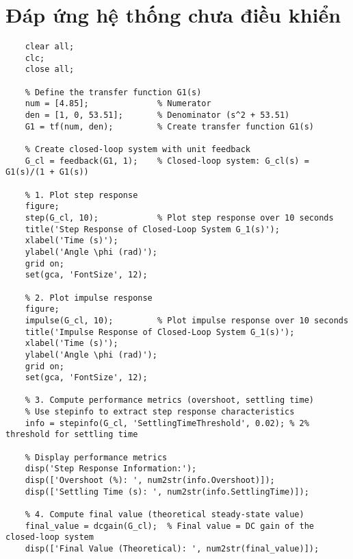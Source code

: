     \section{Đáp ứng hệ thống chưa điều khiển}
    \begin{lstlisting}[caption={Code vẽ đáp ứng hệ thống chưa điều khiển}, label={lst:step}]
    % Clear variables and previous plots
    clear all;
    clc;
    close all;
    
    % Define the transfer function G1(s)
    num = [4.85];              % Numerator
    den = [1, 0, 53.51];       % Denominator (s^2 + 53.51)
    G1 = tf(num, den);         % Create transfer function G1(s)
    
    % Create closed-loop system with unit feedback
    G_cl = feedback(G1, 1);    % Closed-loop system: G_cl(s) = G1(s)/(1 + G1(s))
    
    % 1. Plot step response
    figure;
    step(G_cl, 10);            % Plot step response over 10 seconds
    title('Step Response of Closed-Loop System G_1(s)');
    xlabel('Time (s)');
    ylabel('Angle \phi (rad)');
    grid on;
    set(gca, 'FontSize', 12);
    
    % 2. Plot impulse response
    figure;
    impulse(G_cl, 10);         % Plot impulse response over 10 seconds
    title('Impulse Response of Closed-Loop System G_1(s)');
    xlabel('Time (s)');
    ylabel('Angle \phi (rad)');
    grid on;
    set(gca, 'FontSize', 12);
    
    % 3. Compute performance metrics (overshoot, settling time)
    % Use stepinfo to extract step response characteristics
    info = stepinfo(G_cl, 'SettlingTimeThreshold', 0.02); % 2% threshold for settling time
    
    % Display performance metrics
    disp('Step Response Information:');
    disp(['Overshoot (%): ', num2str(info.Overshoot)]);
    disp(['Settling Time (s): ', num2str(info.SettlingTime)]);
    
    % 4. Compute final value (theoretical steady-state value)
    final_value = dcgain(G_cl);  % Final value = DC gain of the closed-loop system
    disp(['Final Value (Theoretical): ', num2str(final_value)]);
    \end{lstlisting}



    
